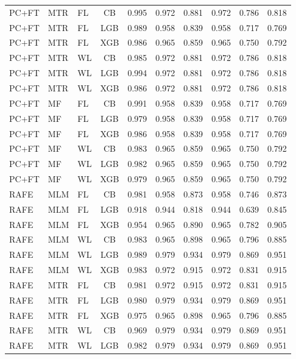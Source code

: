 \documentclass[9pt,a4paper]{article}
\begin{document}
\begin{scriptsize}
\begin{longtable}{lllcrrrrrr}
PC+FT & MTR & FL & CB  & 0.995 & 0.972 & 0.881 & 0.972 & 0.786 & 0.818 \\
PC+FT & MTR & FL & LGB & 0.989 & 0.958 & 0.839 & 0.958 & 0.717 & 0.769 \\
PC+FT & MTR & FL & XGB & 0.986 & 0.965 & 0.859 & 0.965 & 0.750 & 0.792 \\
PC+FT & MTR & WL & CB  & 0.985 & 0.972 & 0.881 & 0.972 & 0.786 & 0.818 \\
PC+FT & MTR & WL & LGB & 0.994 & 0.972 & 0.881 & 0.972 & 0.786 & 0.818 \\
PC+FT & MTR & WL & XGB & 0.986 & 0.972 & 0.881 & 0.972 & 0.786 & 0.818 \\
PC+FT & MF  & FL & CB  & 0.991 & 0.958 & 0.839 & 0.958 & 0.717 & 0.769 \\
PC+FT & MF  & FL & LGB & 0.979 & 0.958 & 0.839 & 0.958 & 0.717 & 0.769 \\
PC+FT & MF  & FL & XGB & 0.986 & 0.958 & 0.839 & 0.958 & 0.717 & 0.769 \\
PC+FT & MF  & WL & CB  & 0.983 & 0.965 & 0.859 & 0.965 & 0.750 & 0.792 \\
PC+FT & MF  & WL & LGB & 0.982 & 0.965 & 0.859 & 0.965 & 0.750 & 0.792 \\
PC+FT & MF  & WL & XGB & 0.979 & 0.965 & 0.859 & 0.965 & 0.750 & 0.792 \\
\midrule
RAFE & MLM & FL & CB  & 0.981 & 0.958 & 0.873 & 0.958 & 0.746 & 0.873 \\
RAFE & MLM & FL & LGB & 0.918 & 0.944 & 0.818 & 0.944 & 0.639 & 0.845 \\
RAFE & MLM & FL & XGB & 0.954 & 0.965 & 0.890 & 0.965 & 0.782 & 0.905 \\
RAFE & MLM & WL & CB  & 0.983 & 0.965 & 0.898 & 0.965 & 0.796 & 0.885 \\
RAFE & MLM & WL & LGB & 0.989 & 0.979 & 0.934 & 0.979 & 0.869 & 0.951 \\
RAFE & MLM & WL & XGB & 0.983 & 0.972 & 0.915 & 0.972 & 0.831 & 0.915 \\
RAFE & MTR & FL & CB  & 0.981 & 0.972 & 0.915 & 0.972 & 0.831 & 0.915 \\
RAFE & MTR & FL & LGB & 0.980 & 0.979 & 0.934 & 0.979 & 0.869 & 0.951 \\
RAFE & MTR & FL & XGB & 0.975 & 0.965 & 0.898 & 0.965 & 0.796 & 0.885 \\
RAFE & MTR & WL & CB  & 0.969 & 0.979 & 0.934 & 0.979 & 0.869 & 0.951 \\
RAFE & MTR & WL & LGB & 0.982 & 0.979 & 0.934 & 0.979 & 0.869 & 0.951 \\

\end{longtable}
\end{scriptsize}
\end{document}
